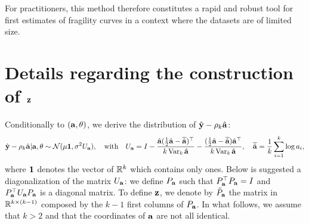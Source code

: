 For practitioners, this method therefore constitutes a rapid and robust tool for first estimates of fragility curves in a context where the datasets are of limited size.





\section{Details regarding the construction of $\mathbf{z}$}\label{lowdoe:app:sec:DiagUa}


Conditionally to $(\mathbf{a}, \theta)$, we derive the distribution of $\hat{\mathbf{y}}-\rho_k\hat{\mathbf{a}}$: 
    \begin{equation}\label{lowdoe:eq:likelihood2}
        \hat{\mathbf{y}} - \rho_k\hat{\mathbf{a}}|\mathbf{a}, \theta \sim\mathcal{N}(\mu \mathbf{1}, \sigma^2 U_{\mathbf{a}})  , \quad\text{with}\quad U_{\mathbf{a}} = I - \frac{\hat{\mathbf{a}}(\frac{1}{2}\hat{\mathbf{a}} - \overline{\hat{\mathbf{a}}})^{\top}  }{k\operatorname{Var}_k\hat{\mathbf{a}}} - \frac{(\frac{1}{2}\hat{\mathbf{a}} - \overline{\hat{\mathbf{a}}}) \hat{\mathbf{a}}^{\top}  }{k\operatorname{Var}_k\hat{\mathbf{a}}} ,\quad \overline{\hat{\mathbf{a}}} = \frac{1}{k}\sum_{i=1}^k \log a_i,
    \end{equation}
where $\mathbf{1}$ denotes the vector of $\mathbb{R}^k$ which contains only ones. %
Below is suggested a diagonalization of the matrix $U_{\mathbf{a}}$: we define $P_{\mathbf{a}}$ such that $P_{\mathbf{a}}^{\top}P_{\mathbf{a}}=I$ and $P_{\mathbf{a}}^{\top}U_{\mathbf{a}}P_{\mathbf{a}}$ is a diagonal matrix. To define $\mathbf{z}$, we denote by $\tilde P_{\mathbf{a}}$ the matrix in $\mathbb{R}^{k\times(k-1)}$ composed by the $k-1$ first columns of $P_{\mathbf{a}}$. {In what follows, we assume that $k>2$ and that the coordinates of $\mathbf{a}$ are not all identical.} \\


